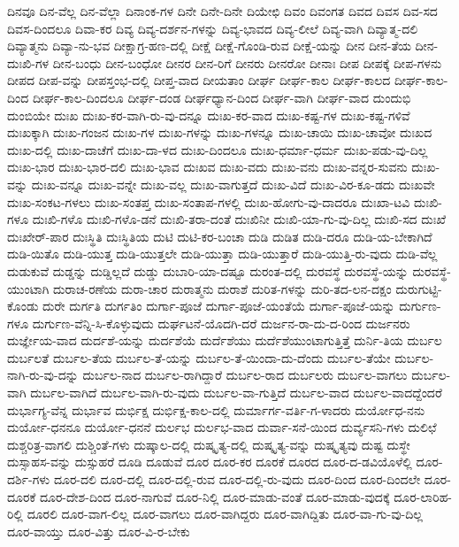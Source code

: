 {ದಿನವೂ
ದಿನ-ವೆಲ್ಲ
ದಿನ-ವೆಲ್ಲಾ
ದಿನಾಂಕ-ಗಳ
ದಿನೇ
ದಿನೇ-ದಿನೇ
ದಿಯೇಛಿ
ದಿವಂ
ದಿವಂಗತ
ದಿವದ
ದಿವಸ
ದಿವ-ಸದ
ದಿವಸ-ದಿಂದಲೂ
ದಿವಾ-ಕರ
ದಿವ್ಯ
ದಿವ್ಯ-ದರ್ಶನ-ಗಳನ್ನು
ದಿವ್ಯ-ಭಾವದ
ದಿವ್ಯ-ಲೀಲೆ
ದಿವ್ಯ-ವಾಗಿ
ದಿವ್ಯಾತ್ಮ-ದಲಿ
ದಿವ್ಯಾತ್ಮನು
ದಿವ್ಯಾ-ನು-ಭವ
ದೀಕ್ಷಾಗ್ರ-ಹಣ-ದಲ್ಲಿ
ದೀಕ್ಷೆ
ದೀಕ್ಷೆ-ಗೊಂಡಿ-ರುವ
ದೀಕ್ಷೆ-ಯನ್ನು
ದೀನ
ದೀನ-ತೆಯ
ದೀನ-ದುಃಖಿ-ಗಳ
ದೀನ-ಬಂಧು
ದೀನ-ಬಂಧೋ
ದೀನರ
ದೀನ-ರಿಗೆ
ದೀನರು
ದೀನರೋ
ದೀನಾಃ
ದೀಪ
ದೀಪಕ್ಕೆ
ದೀಪ-ಗಳನು
ದೀಪದ
ದೀಪ-ವನ್ನು
ದೀಪಸ್ತಂಭ-ದಲ್ಲಿ
ದೀಪ್ತ-ವಾದ
ದೀಯತಾಂ
ದೀರ್ಘ
ದೀರ್ಘ-ಕಾಲ
ದೀರ್ಘ-ಕಾಲದ
ದೀರ್ಘ-ಕಾಲ-ದಿಂದ
ದೀರ್ಘ-ಕಾಲ-ದಿಂದಲೂ
ದೀರ್ಘ-ದಂಡ
ದೀರ್ಘಧ್ಯಾನ-ದಿಂದ
ದೀರ್ಘ-ವಾಗಿ
ದೀರ್ಘ-ವಾದ
ದುಂದುಭಿ
ದುಂಬಿಯೇ
ದುಃಖ
ದುಃಖ-ಕರ-ವಾಗಿ-ರು-ವು-ದನ್ನೂ
ದುಃಖ-ಕರ-ವಾದ
ದುಃಖ-ಕಷ್ಟ-ಗಳ
ದುಃಖ-ಕಷ್ಟ-ಗಳಿವೆ
ದುಃಖಕ್ಕಾಗಿ
ದುಃಖ-ಗಂಜನ
ದುಃಖ-ಗಳ
ದುಃಖ-ಗಳನ್ನು
ದುಃಖ-ಗಳನ್ನೂ
ದುಃಖ-ಚಾಯಿ
ದುಃಖ-ಚಾವೋ
ದುಃಖದ
ದುಃಖ-ದಲ್ಲಿ
ದುಃಖ-ದಾಚೆಗೆ
ದುಃಖ-ದಾ-ಳದ
ದುಃಖ-ದಿಂದಲೂ
ದುಃಖ-ಧರ್ಮಾ-ಧರ್ಮ
ದುಃಖ-ಪಡು-ವು-ದಿಲ್ಲ
ದುಃಖ-ಭಾರ
ದುಃಖ-ಭಾರ-ದಲಿ
ದುಃಖ-ಭಾವ
ದುಃಖವ
ದುಃಖ-ವದು
ದುಃಖ-ವನು
ದುಃಖ-ವನ್ನರ-ಸುವನು
ದುಃಖ-ವನ್ನು
ದುಃಖ-ವನ್ನೂ
ದುಃಖ-ವನ್ನೇ
ದುಃಖ-ವಲ್ಲ
ದುಃಖ-ವಾಗುತ್ತದೆ
ದುಃಖ-ವಿದೆ
ದುಃಖ-ವಿರ-ಕೂ-ಡದು
ದುಃಖವೇ
ದುಃಖ-ಸಂಕಟ-ಗಳಲು
ದುಃಖ-ಸಂತಪ್ತ
ದುಃಖ-ಸಂತಾಪ-ಗಳಲ್ಲಿ
ದುಃಖ-ಹೋಗು-ವು-ದಾದರೂ
ದುಃಖಾ-ಟವಿ
ದುಃಖಿ-ಗಳೂ
ದುಃಖಿ-ಗಳೊ
ದುಃಖಿ-ಗಳೊ-ಡನೆ
ದುಃಖಿ-ತರಾ-ದಂತೆ
ದುಃಖಿನೀ
ದುಃಖಿ-ಯಾ-ಗು-ವು-ದಿಲ್ಲ
ದುಃಖಿ-ಸದ
ದುಃಖೆ
ದುಃಖೇರ್-ಪಾರ
ದುಃಸ್ಥಿತಿ
ದುಃಸ್ಥಿತಿಯ
ದುಟಿ
ದುಟಿ-ಕರ-ಬಂಚಾ
ದುಡಿ
ದುಡಿತ
ದುಡಿ-ದರೂ
ದುಡಿ-ಯ-ಬೇಕಾಗಿದೆ
ದುಡಿ-ಯಿತೊ
ದುಡಿ-ಯುತ್ತ
ದುಡಿ-ಯುತ್ತಲೇ
ದುಡಿ-ಯುತ್ತಾ
ದುಡಿ-ಯುತ್ತಾರೆ
ದುಡಿ-ಯುತ್ತಿ-ರು-ವುದು
ದುಡಿ-ವೆಲ್ಲ
ದುಡುಕುವೆ
ದುಡ್ಡನ್ನು
ದುಡ್ಡಿಲ್ಲದೆ
ದುಡ್ಡು
ದುಬಾರಿ-ಯಾ-ದಷ್ಟೂ
ದುರಂತ-ದಲ್ಲಿ
ದುರವಸ್ಥೆ
ದುರವಸ್ಥೆ-ಯನ್ನು
ದುರವಸ್ಥೆ-ಯುಂಟಾಗಿ
ದುರಾಚ-ರಣೆಯ
ದುರಾ-ಚಾರ
ದುರಾತ್ಮನು
ದುರಾಶೆ
ದುರಿತ-ಗಳನ್ನು
ದುರಿ-ತದ-ಲನ-ದಕ್ಷಂ
ದುರುಗುಟ್ಟಿ-ಕೊಂಡು
ದುರೇ
ದುರ್ಗತಿ
ದುರ್ಗತಿಂ
ದುರ್ಗಾ-ಪೂಜೆ
ದುರ್ಗಾ-ಪೂಜೆ-ಯಂತೆಯೆ
ದುರ್ಗಾ-ಪೂಜೆ-ಯನ್ನು
ದುರ್ಗುಣ-ಗಳೂ
ದುರ್ಗುಣ-ವೆನ್ನಿ-ಸಿ-ಕೊಳ್ಳುವುದು
ದುರ್ಘಟನೆ-ಯೊದಗಿ-ದರೆ
ದುರ್ಜನ-ರಾ-ದು-ದ-ರಿಂದ
ದುರ್ಜನರು
ದುರ್ಜ್ಞೇಯ-ವಾದ
ದುರ್ದಶೆ-ಯನ್ನು
ದುರ್ದಶೆಯೆ
ದುರ್ದೆಶೆಯು
ದುರ್ದೆಶೆಯುಂಟಾಗುತ್ತಿತ್ತೆ
ದುರ್ನಿ-ತಿಯ
ದುರ್ಬಲ
ದುರ್ಬಲತೆ
ದುರ್ಬಲ-ತೆಯ
ದುರ್ಬಲ-ತೆ-ಯನ್ನು
ದುರ್ಬಲ-ತೆ-ಯಿಂದಾ-ದು-ದೆಂದು
ದುರ್ಬಲ-ತೆಯೇ
ದುರ್ಬಲ-ನಾಗಿ-ರು-ವು-ದನ್ನು
ದುರ್ಬಲ-ನಾದ
ದುರ್ಬಲ-ರಾಗಿದ್ದಾರೆ
ದುರ್ಬಲ-ರಾದ
ದುರ್ಬಲರು
ದುರ್ಬಲ-ವಾಗಲು
ದುರ್ಬಲ-ವಾಗಿ
ದುರ್ಬಲ-ವಾಗಿದೆ
ದುರ್ಬಲ-ವಾಗಿ-ರು-ವುದು
ದುರ್ಬಲ-ವಾ-ಗುತ್ತಿದೆ
ದುರ್ಬಲ-ವಾದ
ದುರ್ಬಲ-ವಾದದ್ದೆಂದರೆ
ದುರ್ಭಾಗ್ಯ-ವೆನ್ನ
ದುರ್ಭಾವ
ದುರ್ಭಿಕ್ಷ
ದುರ್ಭಿಕ್ಷ-ಕಾಲ-ದಲ್ಲಿ
ದುರ್ಮಾರ್ಗ-ವರ್ತಿ-ಗ-ಳಾದರು
ದುರ್ಯೋಧ-ನನು
ದುರ್ಯೋ-ಧನನೂ
ದುರ್ಯೋ-ಧನನೆ
ದುರ್ಲಭ
ದುರ್ಲಭ-ವಾದ
ದುರ್ವಾ-ಸನೆ-ಯಿಂದ
ದುರ್ವ್ಯಸನಿ-ಗಳು
ದುಲಿಛೆ
ದುಶ್ಚರಿತ್ರ-ವಾಗಲಿ
ದುಶ್ಚಿಂತೆ-ಗಳು
ದುಷ್ಕಾಲ-ದಲ್ಲಿ
ದುಷ್ಕೃತ್ಯ-ದಲ್ಲಿ
ದುಷ್ಕೃತ್ಯ-ವನ್ನು
ದುಷ್ಕೃತ್ಯವು
ದುಷ್ಟ
ದುಸ್ಥೇ
ದುಸ್ಸಾಹಸ-ವನ್ನು
ದುಸ್ಸುಹರೆ
ದೂಡಿ
ದೂಡುವೆ
ದೂರ
ದೂರ-ಕರ
ದೂರಕೆ
ದೂರದ
ದೂರ-ದ-ಡವಿಯೊಳೆಲ್ಲಿ
ದೂರ-ದರ್ಶಿ-ಗಳು
ದೂರ-ದಲಿ
ದೂರ-ದಲ್ಲಿ
ದೂರ-ದಲ್ಲಿ-ರುವ
ದೂರ-ದಲ್ಲಿ-ರು-ವುದು
ದೂರ-ದಿಂದ
ದೂರ-ದಿಂದಲೇ
ದೂರ-ದೂರಕೆ
ದೂರ-ದೇಶ-ದಿಂದ
ದೂರ-ನಾಗುವೆ
ದೂರ-ನಿಲ್ಲಿ
ದೂರ-ಮಾಡು-ವಂತೆ
ದೂರ-ಮಾಡು-ವುದಕ್ಕೆ
ದೂರ-ಲಾರಿಹ-ರಿಲ್ಲಿ
ದೂರಲಿ
ದೂರ-ವಾಗ-ಲಿಲ್ಲ
ದೂರ-ವಾಗಲು
ದೂರ-ವಾಗಿದ್ದರು
ದೂರ-ವಾಗಿದ್ದಿತು
ದೂರ-ವಾ-ಗು-ವು-ದಿಲ್ಲ
ದೂರ-ವಾಯ್ತು
ದೂರ-ವಿತ್ತು
ದೂರ-ವಿ-ರ-ಬೇಕು
}
